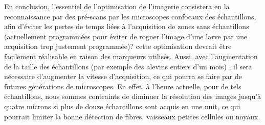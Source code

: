 \documentclass[\main/main.tex]{subfiles}
\begin{document}
En conclusion, l'essentiel de l'optimisation de l'imagerie consistera en la reconnaissance par des pré-scans par les microscopes confocaux des échantillons, afin d'éviter les pertes de temps liées à l'acquisition de zones sans échantillons (actuellement programmées pour éviter de rogner l'image d'une larve par une acquisition trop justement programmée)? cette optimisation devrait être facilement réalisable en raison des marqueurs utilisés. Aussi, avec l'augmentation de la taille des échantillons (par exemple des alevins entiers d'un mois) , il sera nécessaire d'augmenter la vitesse d'acquisition, ce qui pourra se faire par de futures générations de microscopes. En effet, à l'heure actuelle, pour de tels échantillons, nous sommes contraints de diminuer la résolution des images jusqu'à quatre microns si plus de douze échantillons sont acquis en une nuit, ce qui pourrait limiter la bonne détection de fibres, vaisseaux petites cellules ou noyaux.
\end{document}
